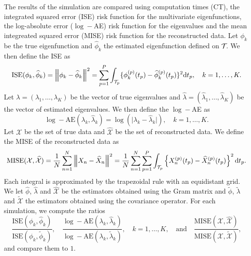 The results of the simulation are compared using computation times (CT), the integrated squared error (ISE) risk function for the multivariate eigenfunctions, the log-absolute error ($\log-$AE) risk function for the eigenvalues and the mean integreated squared error (MISE) risk function for the reconstructed data. Let $\phi_k$ be the true eigenfunction and $\widehat{\phi}_k$ the estimated eigenfunction defined on $\mathcal{T}_{}$. We then define the ISE as 
\begin{equation}\label{eq:ise_eigenfunctions}
    \text{ISE}(\phi_k, \widehat{\phi}_k) = \left|\!\left|\!\left|\phi_k - \widehat{\phi}_k\right|\!\right|\!\right|^2 = \sum_{p = 1}^P \int_{\mathcal{T}_{p}} \{\phi^{(p)}_k(t_p) - \widehat{\phi}^{(p)}_k(t_p)\}^2 {\rm d} t_p, \quad k = 1, \dots, K.
\end{equation}
Let $\lambda = (\lambda_1, \dots, \lambda_K)$ be the vector of true eigenvalues and $\widehat{\lambda} = (\widehat{\lambda}_1, \dots, \widehat{\lambda}_K)$ be the vector of estimated eigenvalues. We then define the $\log-$AE as 
\begin{equation}\label{eq:mse_eigenvalues}
    \log-\text{AE}(\lambda_k, \widehat{\lambda}_k) = \log(\lvert \lambda_k - \widehat{\lambda}_k\rvert), \quad k = 1, \dots, K.
\end{equation}
Let $\mathcal{X}$ be the set of true data and $\widehat{\mathcal{X}}$ be the set of reconstructed data. We define the MISE of the reconstructed data as
\begin{equation}\label{eq:mise_reconstructed_data}
    \text{MISE}(\mathcal{X}, \widehat{\mathcal{X}}) = \frac{1}{N}\sum_{n = 1}^N \left|\!\left|\!\left|X_n - \widehat{X}_n\right|\!\right|\!\right|^2 = \frac{1}{N}\sum_{n = 1}^N \sum_{p = 1}^P \int_{\mathcal{T}_{p}} \left\{X_n^{(p)}(t_p) - \widehat{X}_n^{(p)}(t_p) \right\}^2 {\rm d} t_p.
\end{equation}
Each integral is approximated by the trapezoidal rule with an equidistant grid. We let $\widehat{\phi}$, $\widehat{\lambda}$ and $\widehat{\mathcal{X}}$ be the estimators obtained using the Gram matrix and $\widetilde{\phi}$, $\widetilde{\lambda}$ and $\widetilde{\mathcal{X}}$ the estimators obtained using the covariance operator. For each simulation, we compute the ratios
\begin{equation}
    \frac{\text{ISE}(\phi_k, \widehat{\phi}_k)}{\text{ISE}(\phi_k, \widetilde{\phi}_k)}, \quad \frac{\log -\text{AE}(\lambda_k, \widehat{\lambda}_k)}{\log-\text{AE}(\lambda_k, \widetilde{\lambda}_k)},\quad k = 1, \dots, K, \quad\text{and}\quad \frac{\text{MISE}(\mathcal{X}, \widehat{\mathcal{X}})}{\text{MISE}(\mathcal{X}, \widetilde{\mathcal{X}})},
\end{equation}
and compare them to $1$.

